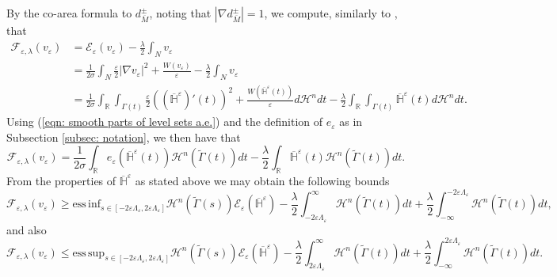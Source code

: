 \documentclass[11pt]{article}
\newcommand{\esssup}{\mathrm{ess\, sup}}
\newcommand{\essinf}{\mathrm{ess\, inf}}
\begin{document}
By the co-area formula to $d^\pm_{\overline{M}}$, noting that $|\nabla d^\pm_{\overline{M}}| = 1$, we compute, similarly to \cite[Section 3.6]{Bellettini-Workman}, that
\begin{align*}
    \mathcal{F}_{\varepsilon,\lambda}(v_\varepsilon) &= \mathcal{E}_\varepsilon(v_\varepsilon) - \frac{\lambda}{2}\int_N v_\varepsilon\\
    &= \frac{1}{2\sigma}\int_N \frac{\varepsilon}{2}|\nabla v_\varepsilon|^2 + \frac{W(v_\varepsilon)}{\varepsilon} - \frac{\lambda}{2}\int_N v_\varepsilon\\
    &= \frac{1}{2\sigma} \int_{\mathbb{R}}\int_{\Gamma(t)} \frac{\varepsilon}{2}\left(\left(\overline{\mathbb{H}}^\varepsilon\right)'(t)\right)^2 + \frac{W(\overline{\mathbb{H}}^\varepsilon(t))}{\varepsilon} d\mathcal{H}^n dt - \frac{\lambda}{2}\int_{\mathbb{R}}\int_{\Gamma(t)} \overline{\mathbb{H}}^\varepsilon(t)d\mathcal{H}^ndt.    
\end{align*}
Using (\ref{eqn: smooth parts of level sets a.e.}) and the definition of $e_\varepsilon$ as in Subsection \ref{subsec: notation}, we then have that
\begin{equation*}
    \mathcal{F}_{\varepsilon,\lambda}(v_\varepsilon) = \frac{1}{2\sigma}\int_{\mathbb{R}} e_\varepsilon(\overline{\mathbb{H}}^\varepsilon(t))\mathcal{H}^n(\widetilde{\Gamma}(t)) dt - \frac{\lambda}{2}\int_{\mathbb{R}} \overline{\mathbb{H}}^\varepsilon(t) \mathcal{H}^n(\widetilde{\Gamma}(t)) dt. 
\end{equation*}
From the properties of $\overline{\mathbb{H}}^\varepsilon$ as stated above we may obtain the following bounds
\begin{equation*}
    \mathcal{F}_{\varepsilon,\lambda}(v_\varepsilon) \geq {\essinf}_{s \in [-2\varepsilon \Lambda_\varepsilon, 2\varepsilon \Lambda_\varepsilon]}\mathcal{H}^n(\widetilde{\Gamma}(s)) \mathcal{E}_\varepsilon(\overline{\mathbb{H}}^\varepsilon) - \frac{\lambda}{2}\int_{-2\varepsilon\Lambda_\varepsilon}^\infty \mathcal{H}^n(\widetilde{\Gamma}(t))dt + \frac{\lambda}{2}\int_{-\infty}^{-2\varepsilon\Lambda_\varepsilon} \mathcal{H}^n(\widetilde{\Gamma}(t))dt,
\end{equation*}
and also 
\begin{equation*}
    \mathcal{F}_{\varepsilon,\lambda}(v_\varepsilon) \leq 
    {\esssup}_{s \in [-2\varepsilon \Lambda_\varepsilon, 2\varepsilon \Lambda_\varepsilon]}\mathcal{H}^n(\widetilde{\Gamma}(s)) \mathcal{E}_\varepsilon(\overline{\mathbb{H}}^\varepsilon) - \frac{\lambda}{2}\int_{2\varepsilon\Lambda_\varepsilon}^\infty \mathcal{H}^n(\widetilde{\Gamma}(t))dt + \frac{\lambda}{2}\int_{-\infty}^{2\varepsilon\Lambda_\varepsilon} \mathcal{H}^n(\widetilde{\Gamma}(t))dt.
\end{equation*}
\end{document}
